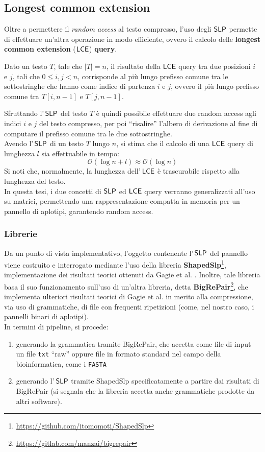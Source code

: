 \subsection{Longest common extension}
Oltre a permettere il \textit{random access} al testo compresso, 
l'uso degli $\mbox{\rm {\sf SLP}}$ permette di effettuare 
un'altra operazione in modo efficiente, ovvero il calcolo delle \textbf{longest
  common extension} ($\mbox{\rm {\sf LCE}}$) \textbf{query}.
\begin{definizione}
  Dato un testo $T$, tale che $|T|=n$, il risultato della $\mbox{\rm {\sf LCE}}$ query tra
  due posizioni $i$ e $j$, tali che $0\leq i,j<n$, corrisponde al più lungo
  prefisso comune tra le sottostringhe che hanno come indice di partenza $i$ e
  $j$, ovvero il più lungo prefisso comune tra $T[i,n-1]$ e $T[j,n-1]$.
\end{definizione}
Sfruttando l'$\,\mbox{\rm {\sf SLP}}$ del testo $T$ è quindi possibile effettuare due
random access agli indici $i$ e $j$ del testo compresso, per poi ``risalire''
l'albero di derivazione al fine di computare il prefisso comune tra le due
sottostringhe.\\ 
Avendo l'$\,\mbox{\rm {\sf SLP}}$ di un testo $T$ lungo $n$, si stima che il calcolo di una
$\mbox{\rm {\sf LCE}}$ query di lunghezza $l$ sia
effettuabile in tempo: 
\begin{equation}
  \label{eq:lcetime}
  \mathcal{O}\left(\log n+l\right)\approx\mathcal{O}\left(\log n\right)
\end{equation}
Si noti che, normalmente, la lunghezza dell'$\,\mbox{\rm {\sf LCE}}$ è trascurabile rispetto
alla lunghezza 
del testo.\\ 
In questa tesi, i due concetti di $\mbox{\rm {\sf SLP}}$ ed $\mbox{\rm {\sf LCE}}$ query verranno generalizzati
all'uso su matrici, permettendo una rappresentazione compatta in 
memoria per un pannello di aplotipi, garantendo random access.
\subsubsection{Librerie}
Da un punto di vista implementativo, l'oggetto contenente  l'$\,\mbox{\rm {\sf SLP}}$ del
pannello viene costruito e interrogato mediante l'uso della libreria
\textbf{ShapedSlp}\footnote{\url{https://github.com/itomomoti/ShapedSlp}},
implementazione dei risultati teorici ottenuti da 
Gagie et al. \cite{slpgagie}. Inoltre, tale libreria basa il suo funzionamento
sull'uso di un'altra libreria, detta
\textbf{BigRePair}\footnote{\url{https://gitlab.com/manzai/bigrepair}}, che 
implementa ulteriori risultati teorici di Gagie et al. \cite{rpair} in merito
alla compressione, via uso di grammatiche, di file con frequenti ripetizioni
(come, nel nostro caso, i pannelli binari di aplotipi).\\
In termini di pipeline, si procede:
\begin{enumerate}
  \item generando la grammatica tramite BigRePair, che accetta
  come file di input un file \texttt{txt} ``raw'' oppure file in formato
  standard nel campo della bioinformatica, come i \texttt{FASTA}
  \item generando l'$\,\mbox{\rm {\sf SLP}}$ tramite ShapedSlp specificatamente a
  partire dai risultati di BigRePair (si segnala che la libreria
  accetta anche grammatiche prodotte da altri software).
\end{enumerate}